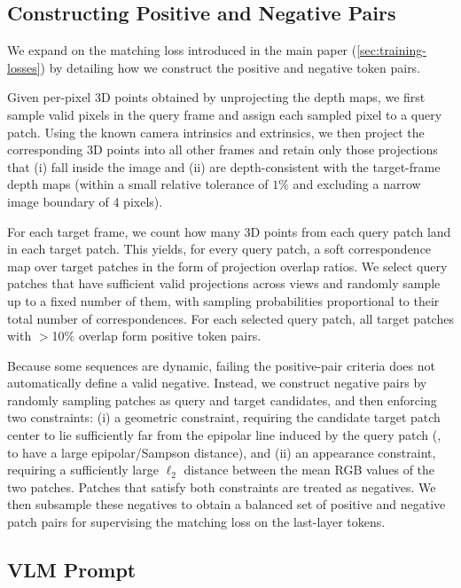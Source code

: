 \subsection{Constructing Positive and Negative Pairs}%
\label{sec:impl-pairs}

We expand on the matching loss introduced in the main paper (\cref{sec:training-losses}) by detailing how we construct the positive and negative token pairs.

Given per-pixel 3D points obtained by unprojecting the depth maps, we first sample valid pixels in the query frame and assign each sampled pixel to a query patch.
Using the known camera intrinsics and extrinsics, we then project the corresponding 3D points into all other frames and retain only those projections that (i) fall inside the image and (ii) are depth-consistent with the target-frame depth maps (within a small relative tolerance of $1\%$ and excluding a narrow image boundary of 4 pixels).

For each target frame, we count how many 3D points from each query patch land in each target patch.
This yields, for every query patch, a soft correspondence map over target patches in the form of projection overlap ratios.
We select query patches that have sufficient valid projections across views and randomly sample up to a fixed number of them, with sampling probabilities proportional to their total number of correspondences.
For each selected query patch, all target patches with $>$10\% overlap form positive token pairs.

Because some sequences are dynamic, failing the positive-pair criteria does not automatically define a valid negative.
Instead, we construct negative pairs by randomly sampling patches as query and target candidates, and then enforcing two constraints:
(i) a geometric constraint, requiring the candidate target patch center to lie sufficiently far from the epipolar line induced by the query patch (\ie, to have a large epipolar/Sampson distance), and
(ii) an appearance constraint, requiring a sufficiently large \(\ell_2\) distance between the mean RGB values of the two patches.
Patches that satisfy both constraints are treated as negatives.
We then subsample these negatives to obtain a balanced set of positive and negative patch pairs for supervising the matching loss on the last-layer tokens.

\subsection{VLM Prompt}%
\label{sec:impl-vlm-prompt}

